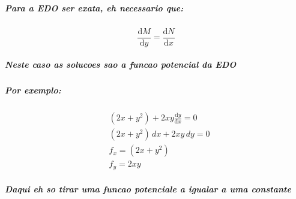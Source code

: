 \documentclass[12pt,twoside, a4paper, twocolumn]{article}
\newcommand\deriv[2]{\frac{\mathrm d #1}{\mathrm d #2}}
\begin{document}
\subparagraph*{Para a EDO ser exata, eh necessario que:}

\begin{equation}
    \deriv{M}{y} = \deriv{N}{x}
\end{equation}

\subparagraph*{Neste caso as solucoes sao a funcao potencial da EDO}

\subparagraph*{Por exemplo:}
\begin{equation}
    \begin{aligned}
         & (2x + y^2) + 2xy \deriv{y}{x} = 0 \\
         & (2x + y^2)\,dx + 2xy \,dy = 0     \\
         & f_x = (2x + y^2)                  \\
         & f_y = 2xy
    \end{aligned}
\end{equation}

\subparagraph*{Daqui eh so tirar uma funcao potenciale a igualar a uma constante}
\end{document}
